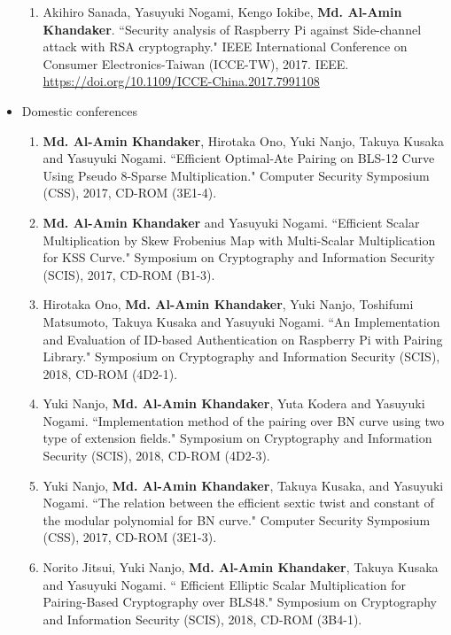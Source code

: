 \begin{itemize}
\begin{enumerate}
	\item Akihiro Sanada, Yasuyuki Nogami, Kengo Iokibe, \textbf{Md. Al-Amin Khandaker}. ``Security analysis of Raspberry Pi against Side-channel attack with RSA cryptography." IEEE International Conference on Consumer Electronics-Taiwan (ICCE-TW), 2017. IEEE.  \url{https://doi.org/10.1109/ICCE-China.2017.7991108} 
	
\end{enumerate}
\vspace{10mm}
\large
\item Domestic conferences
\begin{enumerate}
	
	\item \textbf{Md. Al-Amin Khandaker}, Hirotaka Ono, Yuki Nanjo, Takuya Kusaka and Yasuyuki Nogami. ``Efficient Optimal-Ate Pairing on BLS-12 Curve Using Pseudo 8-Sparse Multiplication." Computer Security Symposium  (CSS),  2017, CD-ROM (3E1-4). 
	
	\item \textbf{Md. Al-Amin Khandaker} and Yasuyuki Nogami. ``Efficient Scalar Multiplication by Skew Frobenius Map with Multi-Scalar Multiplication for KSS Curve." Symposium on Cryptography and Information Security (SCIS),  2017, CD-ROM (B1-3). 
	
	\item  Hirotaka Ono, \textbf{Md. Al-Amin Khandaker}, Yuki Nanjo, Toshifumi Matsumoto, Takuya Kusaka and Yasuyuki Nogami. ``An Implementation and Evaluation of ID-based Authentication on Raspberry Pi with Pairing Library." Symposium on Cryptography and Information Security (SCIS),  2018, CD-ROM (4D2-1).  
	
	\item Yuki Nanjo, \textbf{Md. Al-Amin Khandaker}, Yuta Kodera and Yasuyuki Nogami. ``Implementation method of the pairing over BN curve
	using two type of extension fields." Symposium on Cryptography and Information Security (SCIS),  2018, CD-ROM (4D2-3).
	
	\item Yuki Nanjo,  \textbf{Md. Al-Amin Khandaker}, Takuya Kusaka, and  Yasuyuki Nogami. ``The relation between the efficient sextic twist and constant of the modular polynomial for BN curve." Computer Security Symposium  (CSS),  2017, CD-ROM (3E1-3). 
	
	\item  Norito Jitsui, Yuki Nanjo, \textbf{Md. Al-Amin Khandaker}, Takuya Kusaka and Yasuyuki Nogami. ``	Efficient Elliptic Scalar Multiplication for Pairing-Based Cryptography over BLS48." Symposium on Cryptography and Information Security (SCIS),  2018, CD-ROM (3B4-1).  
	
		
\end{enumerate}
\normalsize
\end{itemize}

